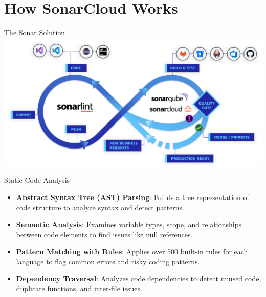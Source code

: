 \documentclass{beamer}
\begin{document}
\section[How SonarCloud Works]{How SonarCloud Works}


\begin{frame}{The Sonar Solution}
  \vspace{0.6em}
  \includegraphics[scale=0.22]{fig/sonar_solution.png}
\end{frame}


\begin{frame}{Static Code Analysis}
  \begin{itemize}
    \item \textbf{Abstract Syntax Tree (AST) Parsing}: Builds a tree representation of code structure to analyze syntax and detect patterns.
    \item \textbf{Semantic Analysis}: Examines variable types, scope, and relationships between code elements to find issues like null references.
    \item \textbf{Pattern Matching with Rules}: Applies over 500 built-in rules for each language to flag common errors and risky coding patterns.
    \item \textbf{Dependency Traversal}: Analyzes code dependencies to detect unused code, duplicate functions, and inter-file issues.
\end{itemize}
\end{frame}
\end{document}
